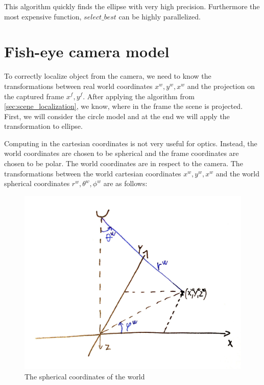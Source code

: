\documentclass[a4paper,12pt,titlepage, twoside]{article}
\numberwithin{figure}{section}
\begin{document}
This algorithm quickly finds the ellipse with very high precision. Furthermore the most expensive function, $select\_best$ can be highly parallelized.

\section{Fish-eye camera model}
To correctly localize object from the camera, we need to know the transformations between real world coordinates $x^w, y^w, x^w$ and the projection on the captured frame $x^f, y^f$. After applying the algorithm from \ref{sec:scene_localization}, we know, where in the frame the scene is projected. First, we will consider the circle model and at the end we will apply the transformation to ellipse. 

Computing in the cartesian coordinates is not very useful for optics. Instead, the world coordinates are chosen to be spherical and the frame coordinates are chosen to be polar. The world coordinates are in respect to the camera. 
The transformations between the world cartesian coordinates $x^w, y^w, x^w$ and the world spherical coordinates $r^w, \theta^w, \phi^w$ are as follows:

\begin{figure}[h]
\centering
\includegraphics[width=1\linewidth]{fig/sphere.jpg}
\caption{The spherical coordinates of the world}
\label{fig:sphere}
\end{figure}
\end{document}
